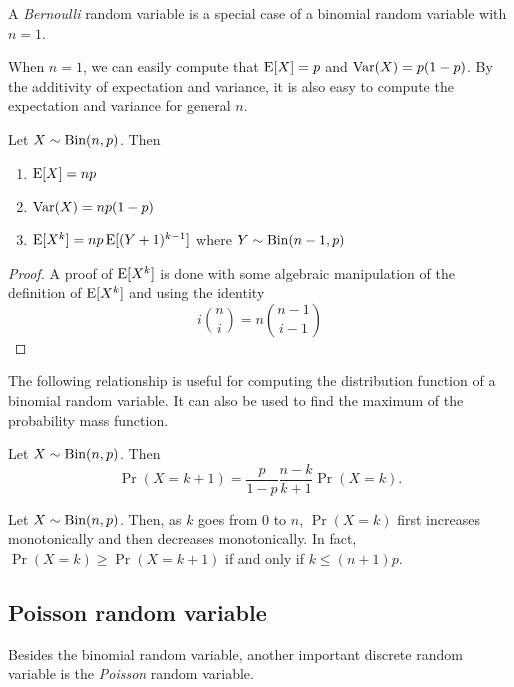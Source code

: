\documentclass{article}
\begin{document}
\begin{remark}
  A \emph{Bernoulli} random variable is a special case of a binomial random variable with $n = 1$.
\end{remark}

When $n = 1$, we can easily compute that $\operatorname{E}[X] = p$ and $\operatorname{Var}(X) = p(1 - p)$.
By the additivity of expectation and variance, it is also easy to compute the expectation and variance for general $n$.
\begin{theorem}
  Let $X \sim \textnormal{Bin}(n, p)$.
  Then
  \begin{enumerate}
    \item $\operatorname{E}[X] = np$
    \item $\operatorname{Var}(X) = np(1 - p)$
    \item $\operatorname{E}[X^k] = np \operatorname{E}[(Y + 1)^{k - 1}]$ where $Y \sim \textnormal{Bin}(n - 1, p)$
  \end{enumerate}
\end{theorem}

\begin{proof}
  A proof of $\operatorname{E}[X^k]$ is done with some algebraic manipulation of the definition of $\operatorname{E}[X^k]$ and using the identity
  \[
    i \binom{n}{i} = n \binom{n - 1}{i - 1}
  \]
\end{proof}

The following relationship is useful for computing the distribution function of a binomial random variable.
It can also be used to find the maximum of the probability mass function.

\begin{proposition}[Relationship between $\Pr(X = k + 1)$ and $\Pr(X = k)$]
  Let $X \sim \textnormal{Bin}(n, p)$. Then
  \[
    \Pr(X = k + 1) = \frac{p}{1 - p} \frac{n - k}{k + 1} \Pr(X = k).
  \]
\end{proposition}

\begin{corollary}
  Let $X \sim \textnormal{Bin}(n, p)$.
  Then, as $k$ goes from $0$ to $n$, $\Pr(X = k)$ first increases monotonically and then decreases monotonically.
  In fact, $\Pr(X = k) \geq \Pr(X = k + 1)$ if and only if $k \leq (n + 1)p$.
\end{corollary}

\subsection{Poisson random variable}

Besides the binomial random variable, another important discrete random variable is the \emph{Poisson} random variable.
\end{document}

